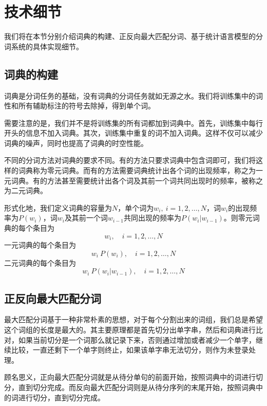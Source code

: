 \documentclass[11pt,a4paper]{article}
\begin{document}
\section{技术细节}

我们将在本节分别介绍词典的构建、正反向最大匹配分词、基于统计语言模型的分词系统的具体实现细节。

\subsection{词典的构建}
词典是分词任务的基础，没有词典的分词任务就如无源之水。我们将训练集中的词性和所有辅助标注的符号去除掉，得到单个词。

需要注意的是，我们并不是将训练集的所有词都加到词典中。首先，训练集中每行开头的信息不加入词典。其次，训练集中重复的词不加入词典。这样不仅可以减少词典的噪声，同时也提高了词典的时空性能。

不同的分词方法对词典的要求不同。有的方法只要求词典中包含词即可，我们将这样的词典称为零元词典。而有的方法需要词典统计出各个词的出现频率，称之为一元词典。有的方法甚至需要统计出各个词及其前一个词共同出现时的频率，被称之为二元词典。

形式化地，我们定义词典的容量为$N$，单个词为$w_i,\ i=1, 2, \dots, N$，词$w_i$的出现频率为$P(w_i)$，词$w_i$及其前一个词$w_{i-1}$共同出现的频率为$P(w_i|w_{i-1})$。则零元词典的每个条目为
\begin{equation}
	w_i,\quad i=1, 2, \dots, N
\end{equation}
一元词典的每个条目为
\begin{equation}
	w_i\ P(w_i),\quad i=1, 2, \dots, N
\end{equation}
二元词典的每个条目为
\begin{equation}
	w_i\ P(w_i|w_{i-1}),\quad i=1, 2, \dots, N
\end{equation}

\subsection{正反向最大匹配分词}
最大匹配分词基于一种非常朴素的思想，对于每个分割出来的词组，我们总是希望这个词组的长度是最大的。其主要原理都是首先切分出单字串，然后和词典进行比对，如果当前切分是一个词那么就记录下来，否则通过增加或者减少一个单字，继续比较，一直还剩下一个单字则终止，如果该单字串无法切分，则作为未登录处理。

顾名思义，正向最大匹配分词就是从待分单句的前面开始，按照词典中的词进行切分，直到切分完成。而反向最大匹配分词则是从待分序列的末尾开始，按照词典中的词进行切分，直到切分完成。
\end{document}
